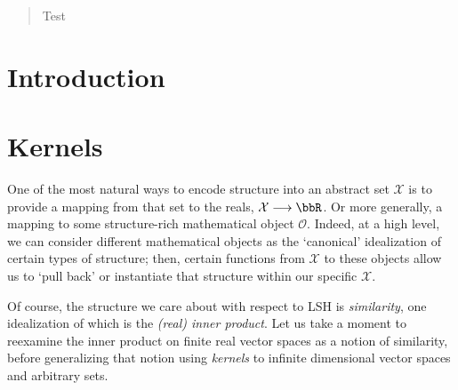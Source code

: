 \documentclass[twoside,11pt]{homework}
\renewcommand{\to}{\longrightarrow}
\begin{document}
\maketitle

\begin{abstract} Test
\end{abstract}

\section{Introduction}


\section{Kernels} %

One of the most natural ways to encode structure into an abstract set $\mathcal{X}$ is to provide a mapping  from that set to the reals, $\mathcal{X} \to \bbR$. Or more generally, a mapping to some structure-rich mathematical object $\mathcal{O}$. Indeed, at a high level, we can consider different mathematical objects as the `canonical' idealization of certain types of structure; then, certain functions from $\mathcal{X}$ to these objects allow us to `pull back' or instantiate that structure within our specific $\mathcal{X}$.

Of course, the structure we care about with respect to LSH is \emph{similarity}, one idealization of which is the \emph{(real) inner product}. Let us take a moment to reexamine the inner product on finite real vector spaces as a notion of similarity, before generalizing that notion using \emph{kernels} to infinite dimensional vector spaces and arbitrary sets.
\end{document}
